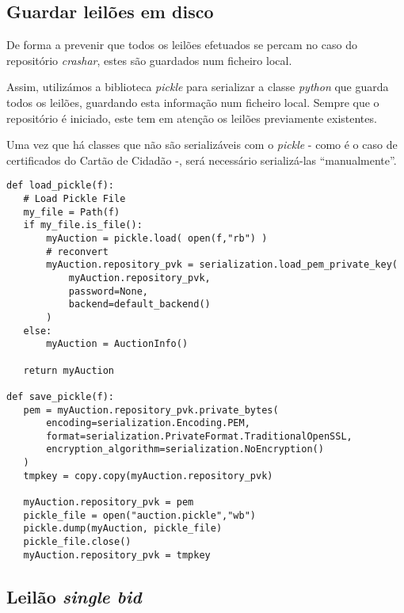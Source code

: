 \documentclass[12pt]{article}
\begin{document}
\subsection{Guardar leilões em disco}

\par De forma a prevenir que todos os leilões efetuados se percam no caso do repositório \textit{crashar}, estes são guardados num ficheiro local.

\par Assim, utilizámos a biblioteca \textit{pickle} para serializar a classe \textit{python} que guarda todos os leilões, guardando esta informação num ficheiro local. Sempre que o repositório é iniciado, este tem em atenção os leilões previamente existentes.

\par Uma vez que há classes que não são serializáveis com o \textit{pickle} - como é o caso de certificados do Cartão de Cidadão -, será necessário serializá-las “manualmente”.


\vspace{5mm} %

\begin{lstlisting}[caption={Escrita e Leitura de Ficheiros com a Biblioteca \textit{Pickle}},captionpos=b]
def load_pickle(f):
   # Load Pickle File
   my_file = Path(f)
   if my_file.is_file():
       myAuction = pickle.load( open(f,"rb") )
       # reconvert
       myAuction.repository_pvk = serialization.load_pem_private_key(
           myAuction.repository_pvk,
           password=None,
           backend=default_backend()
       )
   else:
       myAuction = AuctionInfo()

   return myAuction

def save_pickle(f):
   pem = myAuction.repository_pvk.private_bytes(
       encoding=serialization.Encoding.PEM,
       format=serialization.PrivateFormat.TraditionalOpenSSL,
       encryption_algorithm=serialization.NoEncryption()
   )
   tmpkey = copy.copy(myAuction.repository_pvk)

   myAuction.repository_pvk = pem
   pickle_file = open("auction.pickle","wb")
   pickle.dump(myAuction, pickle_file)
   pickle_file.close()
   myAuction.repository_pvk = tmpkey

\end{lstlisting}





\subsection{Leilão \textit{single bid}}
\end{document}
